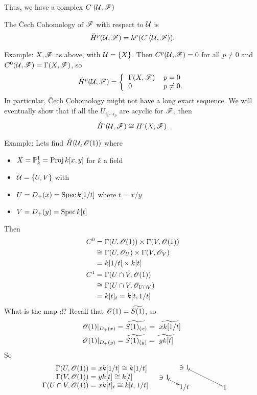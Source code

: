 Thus, we have a complex $C^{\cdot}(\mathcal{U},\mathscr{F})$
\begin{definition}
The \v{C}ech Cohomology of $\mathscr{F}$ with respect to $\mathcal{U}$ is
\[
    \check H^p(\mathcal{U},\mathscr{F}) = h^p(C^{\cdot}(\mathcal{U},\mathscr{F})).
\]
\end{definition}


Example: $X,\mathscr{F}$ as above, with $\mathcal{U}=\{X\}$.  Then $C^p(\mathcal{U},\mathscr{F})=0$
for all $p\not=0$ and $C^0(\mathcal{U},\mathscr{F})=\Gamma(X,\mathscr{F})$, so
\[
    \check{H}^p(\U,\F) = \left\{
 \begin{tabular}{ll}
 $\Gamma(X,\F)$ & $p=0$ \\
 0 & $p\not=0$.
 \end{tabular} \right.
\]
In particular, \v{C}ech Cohomology might not have a long exact
sequence.  We will eventually show that if all the $U_{i_1\cdots
i_p}$ are acyclic for $\mathscr{F}$, then
\[
    \check H^{\cdot}(\mathcal{U},\mathscr{F}) \cong H^{\cdot} (X,\mathscr{F}).
\]

Example: Lets find $\check H(\mathcal{U},\mathscr{O}(1))$ where
\begin{itemize}
 \item[] $X=\mathbb{P}^1_k = \text{\rm Proj\,} k[x,y]$ for $k$ a field
 \item[] $\mathcal{U} = \{U,V\}$ with
 \item[] \quad $U=D_+(x) = \text{\rm Spec\,} k[1/t]$ where $t=x/y$
 \item[] \quad $V=D_+(y) = \text{\rm Spec\,} k[t]$
\end{itemize}
Then \begin{align*}
 C^0 &= \Gamma(U,\mathscr{O}(1))\times \Gamma(V,\mathscr{O}(1)) \\
    &\cong \Gamma(U,\mathscr{O}_U)\times \Gamma(V,\mathscr{O}_V) \\
    &= k[1/t]\times k[t]\\
 C^1 &= \Gamma(U\cap V,\mathscr{O}(1)) \\
    &\cong \Gamma(U\cap V,\mathscr{O}_{U\cap V})\\
    &= k[t]_t = k[t,1/t]
 \end{align*}
What is the map $d$?  Recall that $\mathscr{O}(1) = \widetilde{S(1)}$, so
\begin{align*}
 \O(1)|_{D_+(x)} &= \widetilde{S(1)_{(x)}} = \widetilde{\ xk[1/t]\ }\\
 \O(1)|_{D_+(y)} &= \widetilde{S(1)_{(y)}} = \widetilde{\ yk[t]\ }
\end{align*}
So
\[
 {\begin{array}{rl}
  \Gamma(U,\O(1)) & \hspace{-2.5mm} = xk[1/t]\cong k[1/t]    \\
  \Gamma(V,\O(1)) & \hspace{-2.5mm} = yk[t]\cong k[t]        \\
  \Gamma(U\cap V,\O(1)) & \hspace{-2.5mm} = xk[t]_t \cong k[t,1/t]
 \end{array}}\quad
 \begin{xy}<1cm,0cm>:<0cm,5mm>::
   \ar@{|->} (0,0) *{\ni 1};(1,-1) *{1/t},
   \ar@{|->} (1,1) *{\ni 1};(3,-1) *{1},
 \end{xy}
\]

